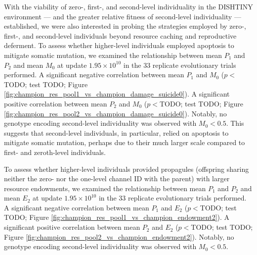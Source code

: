 With the viability of zero-, first-, and second-level individuality in the DISHTINY environment --- and the greater relative fitness of second-level individuality --- established, we were also interested in probing the strategies employed by zero-, first-, and second-level individuals beyond resource caching and reproductive deferment.
To assess whether higher-level individuals employed apoptosis to mitigate somatic mutation, we examined the relationship between mean $P_1$ and $P_2$ and mean $M_0$ at update $1.95 \times 10^{10}$ in the 33 replicate evolutionary trials performed.
A significant negative correlation between mean $P_1$ and $M_0$ ($p < $TODO; test TODO; Figure \ref{fig:champion_res_pool1_vs_champion_damage_suicide0}).
A significant positive correlation between mean $P_2$ and $M_0$ ($p < $TODO; test TODO; Figure \ref{fig:champion_res_pool2_vs_champion_damage_suicide0}).
Notably, no genotype encoding second-level individuality was observed with $M_0 < 0.5$.
This suggests that second-level individuals, in particular, relied on apoptosis to mitigate somatic mutation, perhaps due to their much larger scale compared to first- and zeroth-level individuals.

To assess whether higher-level individuals provided propagules (offspring sharing neither the zero- nor the one-level channel ID with the parent) with larger resource endowments, we examined the relationship between mean $P_1$ and $P_2$ and mean $E_2$ at update $1.95 \times 10^{10}$ in the 33 replicate evolutionary trials performed.
A significant negative correlation between mean $P_1$ and $E_2$ ($p < $TODO; test TODO; Figure \ref{fig:champion_res_pool1_vs_champion_endowment2}).
A significant positive correlation between mean $P_2$ and $E_2$ ($p < $TODO; test TODO; Figure \ref{fig:champion_res_pool2_vs_champion_endowment2}).
Notably, no genotype encoding second-level individuality was observed with $M_0 < 0.5$.
